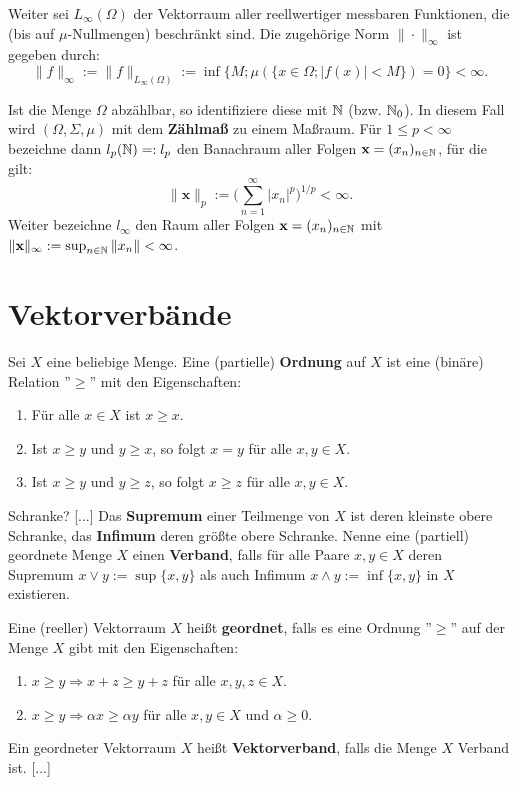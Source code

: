 \par
Weiter sei $L_\infty(\Omega)$ der Vektorraum aller reellwertiger messbaren Funktionen, die (bis auf $\mu$-Nullmengen) beschränkt sind. Die zugehörige Norm $\|\cdot\|_\infty$ ist gegeben durch: 
\begin{equation*}
\|f\|_\infty:=\|f\|_{L_\infty(\Omega)}:=\inf\{M;\mu(\{x\in\Omega; |f(x)|<M\})=0\}<\infty.
\end{equation*}

\par
Ist die Menge $\Omega$ abzählbar, so identifiziere diese mit $\mathbb{N}$ (bzw. $\mathbb{N}_0$). In diesem Fall wird $(\Omega,\Sigma, \mu)$ mit dem \textbf{Zählmaß} zu einem Maßraum. Für $1\leq p< \infty$ bezeichne dann $l_p(\mathbb{N})=:l_p$ den Banachraum aller Folgen $\textbf{x}=(x_n)_{n\in\mathbb{N}}$, für die gilt:
\begin{equation*}
\|\textbf{x}\|_p:=\Big(\sum_{n=1}^\infty|x_n|^p\Big)^{1/p}< \infty.
\end{equation*}
Weiter bezeichne $l_\infty$ den Raum aller Folgen $\textbf{x}=(x_n)_{n\in\mathbb{N}}$ mit $\|\textbf{x}\|_\infty :=\sup_{n\in\mathbb{N}}\|x_n\|<\infty$.

\par
[...]


\section{Vektorverbände}

\begin{defi}
Sei $X$ eine beliebige Menge. Eine (partielle) \textbf{Ordnung} auf $X$ ist eine (binäre) Relation ''$\geq$'' mit den Eigenschaften:
\begin{enumerate}
\item Für alle $x\in X$ ist $x\geq x$.
\item Ist $x\geq y$ und $y\geq x$, so folgt $x=y$ für alle $x,y\in X$.  
\item Ist $x\geq y$ und $y\geq z$, so folgt $x\geq z$ für alle $x,y\in X$.
\end{enumerate}
Schranke?
[...]
Das \textbf{Supremum} einer Teilmenge von $X$ ist deren kleinste obere Schranke, das \textbf{Infimum} deren größte obere Schranke. Nenne eine (partiell) geordnete Menge $X$ einen \textbf{Verband}, falls für alle Paare $x,y\in X$ deren Supremum $x\vee y:=\sup\{x,y\}$ als auch Infimum $x\wedge y:=\inf\{x,y\}$ in $X$ existieren.
\end{defi}

\begin{defi}
Eine (reeller) Vektorraum $X$ heißt \textbf{geordnet}, falls es eine Ordnung ''$\geq$'' auf der Menge $X$ gibt mit den Eigenschaften:
\begin{enumerate}
\item $x\geq y\Rightarrow x+z\geq y+z$ für alle $x,y,z\in X$. 
\item $x\geq y\Rightarrow \alpha x\geq \alpha y$ für alle $x,y\in X$ und $\alpha\geq0$.
\end{enumerate}
Ein geordneter Vektorraum $X$ heißt \textbf{Vektorverband}, falls die Menge $X$ Verband ist. [...]
\end{defi}

